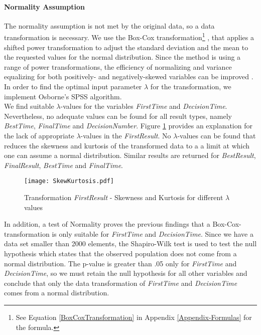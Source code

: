 \paragraph{Normality Assumption}
The normality assumption is not met by the original data, so a data transformation is necessary.
We use the Box-Cox transformation\footnote{See Equation \ref{BoxCoxTransformation} in Appendix \ref{Appendix-Formulas} for the formula.} \citep{Sakia1992}, that applies a shifted power transformation to adjust the standard deviation and the mean to the requested values for the normal distribution. Since the method is using a range of power transformations, the efficiency of normalizing and variance equalizing for both positively- and negatively-skewed variables can be improved \citep{Osborne2010}. In order to find the optimal input parameter $\lambda$ for the transformation, we implement Osborne's SPSS algorithm. \\
We find suitable $\lambda$-values for the variables \textit{FirstTime} and \textit{DecisionTime}. Nevertheless, no adequate values can be found for all result types, namely \textit{BestTime}, \textit{FinalTime} and \textit{DecisionNumber}.
Figure \ref{fig:SkewKurtosis} provides an explanation for the lack of appropriate $\lambda$-values in the \textit{FirstResult}. No $\lambda$-values can be found that reduces the skewness and kurtosis of the transformed data to a a limit at which one can assume a normal distribution. Similar results are returned for \textit{BestResult}, \textit{FinalResult}, \textit{BestTime} and \textit{FinalTime}.
\begin{figure}[htbp] %
\begin{center} 
\texttt{[image: SkewKurtosis.pdf]}
  \caption{Transformation \textit{FirstResult} - Skewness and Kurtosis for different $\lambda$ values}
    \label{fig:SkewKurtosis} 
\end{center}
\end{figure}

In addition, a test of Normality proves the previous findings that a Box-Cox-transformation is only suitable for \textit{FirstTime} and \textit{DecisionTime}. Since we have a data set smaller than 2000 elements, the Shapiro-Wilk test \citep{Shapiro1965} is used to test the null hypothesis which states that the observed population does not come from a normal distribution. The p-value is greater than .05 only for \textit{FirstTime} and \textit{DecisionTime}, so we must retain the null hypothesis for all other variables and conclude that only the data transformation of \textit{FirstTime} and \textit{DecisionTime} comes from a normal distribution.

